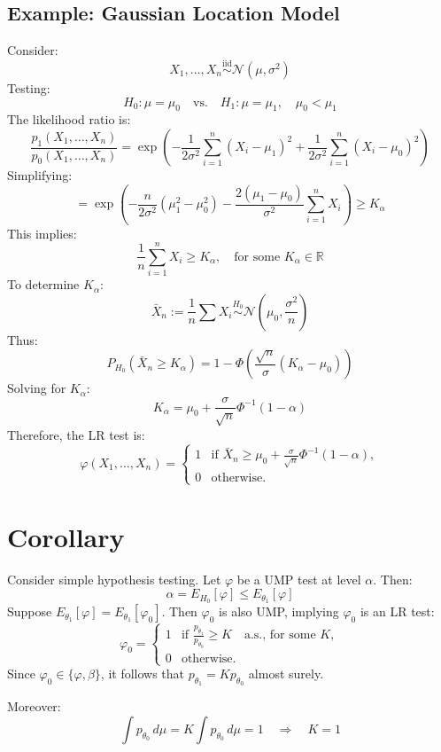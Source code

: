 \documentclass[open=any, 11pt,paper=A4]{scrreprt}
\begin{document}
\subsection*{Example: Gaussian Location Model}
Consider:
\[
X_1, \dots, X_n \overset{\text{iid}}{\sim} \mathcal{N}(\mu, \sigma^2)
\]
Testing:
\[
H_0 : \mu = \mu_0 \quad \text{vs.} \quad H_1 : \mu = \mu_1, \quad \mu_0 < \mu_1
\]
The likelihood ratio is:
\[
\frac{p_1(X_1, \dots, X_n)}{p_0(X_1, \dots, X_n)} = \exp \left( -\frac{1}{2\sigma^2} \sum_{i=1}^n (X_i - \mu_1)^2 + \frac{1}{2\sigma^2} \sum_{i=1}^n (X_i - \mu_0)^2 \right)
\]
Simplifying:
\[
= \exp \left( -\frac{n}{2\sigma^2} (\mu_1^2 - \mu_0^2) - \frac{2(\mu_1 - \mu_0)}{\sigma^2} \sum_{i=1}^n X_i \right) \geq K_\alpha
\]
This implies:
\[
\frac{1}{n} \sum_{i=1}^n X_i \geq K_\alpha, \quad \text{for some } K_\alpha \in \mathbb{R}
\]
To determine \( K_\alpha \):
\[
\bar{X}_n := \frac{1}{n} \sum X_i \overset{H_0}{\sim} \mathcal{N}\left(\mu_0, \frac{\sigma^2}{n}\right)
\]
Thus:
\[
P_{H_0} \left( \bar{X}_n \geq K_\alpha \right) = 1 - \Phi \left( \frac{\sqrt{n}}{\sigma} (K_\alpha - \mu_0) \right)
\]
Solving for \( K_\alpha \):
\[
K_\alpha = \mu_0 + \frac{\sigma}{\sqrt{n}} \Phi^{-1}(1 - \alpha)
\]
Therefore, the LR test is:
\[
\varphi(X_1, \dots, X_n) = 
\begin{cases} 
1 & \text{if } \bar{X}_n \geq \mu_0 + \frac{\sigma}{\sqrt{n}} \Phi^{-1}(1 - \alpha), \\
0 & \text{otherwise}.
\end{cases}
\]

\section*{Corollary}

Consider simple hypothesis testing. Let \( \varphi \) be a UMP test at level \( \alpha \). Then:
\[
\alpha = E_{H_0}[\varphi] \leq E_{\theta_1}[\varphi]
\]
Suppose \( E_{\theta_1}[\varphi] = E_{\theta_1}[\varphi_0] \). Then \( \varphi_0 \) is also UMP, implying \( \varphi_0 \) is an LR test:
\[
\varphi_0 = 
\begin{cases} 
1 & \text{if } \frac{p_{\theta_1}}{p_{\theta_0}} \geq K \quad \text{a.s., for some } K, \\
0 & \text{otherwise}.
\end{cases}
\]
Since \( \varphi_0 \in \{\varphi, \beta\} \), it follows that \( p_{\theta_1} = K p_{\theta_0} \) almost surely.

Moreover:
\[
\int p_{\theta_0} \, d\mu = K \int p_{\theta_0} \, d\mu = 1 \quad \Rightarrow \quad K = 1
\]
\end{document}

